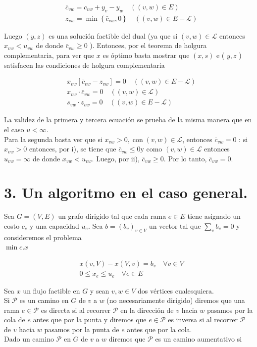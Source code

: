 \documentclass[10pt]{article}
\begin{document}
$$
\begin{aligned}
& \bar{c}_{v w}=c_{v w}+y_{v}-y_{w} \quad((v, w) \in E) \\
& z_{v w}=\min \left\{\bar{c}_{v w}, 0\right\} \quad((v, w) \in E-\mathcal{L})
\end{aligned}
$$

Luego $(y, z)$ es una solución factible del dual (ya que si $(v, w) \in \mathcal{L}$ entonces $x_{v w}<u_{v w}$ de donde $\bar{c}_{v w} \geq 0$ ). Entonces, por el teorema de holgura complementaria, para ver que $x$ es óptimo basta mostrar que $(x, s)$ e ( $y, z$ ) satisfacen las condiciones de holgura complementaria

$$
\begin{aligned}
& x_{v w}\left[\bar{c}_{v w}-z_{v w}\right]=0 \quad((v, w) \in E-\mathcal{L}) \\
& x_{v w} \cdot \bar{c}_{v w}=0 \quad((v, w) \in \mathcal{L}) \\
& s_{v w} \cdot z_{v w}=0 \quad((v, w) \in E-\mathcal{L})
\end{aligned}
$$

La validez de la primera y tercera ecuación se prueba de la misma manera que en el caso $u<\infty$.\\
Para la segunda basta ver que si $x_{v w}>0, \operatorname{con}(v, w) \in \mathcal{L}$, entonces $\bar{c}_{v w}=0$ : si $x_{v w}>0$ entonces, por i), se tiene que $\bar{c}_{v w} \leq 0 \mathrm{y}$ como $(v, w) \in \mathcal{L}$ entonces $u_{v w}=\infty$ de donde $x_{v w}<u_{v w}$. Luego, por ii), $\bar{c}_{v w} \geq 0$. Por lo tanto, $\bar{c}_{v w}=0$.

\section*{3. Un algoritmo en el caso general.}
Sea $G=(V, E)$ un grafo dirigido tal que cada rama $e \in E$ tiene asignado un costo $c_{e}$ y una capacidad $u_{e}$. Sea $b=\left(b_{v}\right)_{v \in V}$ un vector tal que $\sum_{v} b_{v}=0$ y consideremos el problema\\
$\min c . x$

$$
\begin{aligned}
& x(v, V)-x(V, v)=b_{v} \quad \forall v \in V \\
& 0 \leq x_{e} \leq u_{e} \quad \forall e \in E
\end{aligned}
$$

Sea $x$ un flujo factible en $G$ y sean $v, w \in V$ dos vértices cualesquiera.\\
Si $\mathcal{P}$ es un camino en $G$ de $v$ a $w$ (no necesariamente dirigido) diremos que una rama $e \in \mathcal{P}$ es directa si al recorrer $\mathcal{P}$ en la dirección de $v$ hacia $w$ pasamos por la cola de $e$ antes que por la punta y diremos que $e \in \mathcal{P}$ es inversa si al recorrer $\mathcal{P}$ de $v$ hacia $w$ pasamos por la punta de $e$ antes que por la cola.\\
Dado un camino $\mathcal{P}$ en $G$ de $v$ a $w$ diremos que $\mathcal{P}$ es un camino aumentativo si
\end{document}
